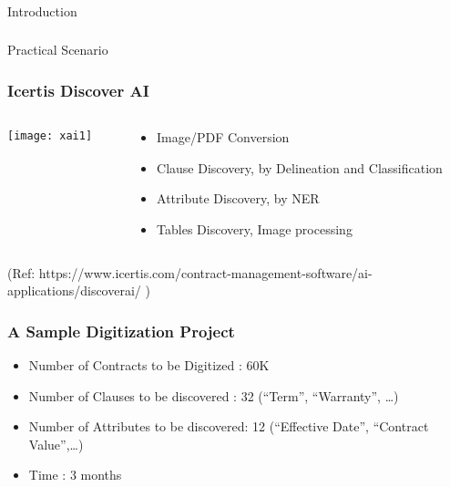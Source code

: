 \begin{frame}[fragile]\frametitle{}
\begin{center}
{\Large Introduction}
\end{center}
\end{frame}

\begin{frame}[fragile]\frametitle{}
\begin{center}
{\Large Practical Scenario}
\end{center}
\end{frame}

\begin{frame}[fragile]\frametitle{Icertis Discover AI}
\begin{columns}
    \begin{column}[T]{0.6\linewidth}
      \begin{center}
      \texttt{[image: xai1]}
	  	\end{center}
    \end{column}
    \begin{column}[T]{0.4\linewidth}

			
				\begin{itemize}
				\item Image/PDF Conversion
				\item Clause Discovery, by Delineation and Classification
				\item Attribute Discovery, by NER
				\item Tables Discovery, Image processing
				\end{itemize}
    \end{column}
  \end{columns}
  
\tiny{(Ref: https://www.icertis.com/contract-management-software/ai-applications/discoverai/ )}
\end{frame}

\begin{frame}[fragile]\frametitle{A Sample Digitization Project}
\begin{itemize}
\item Number of Contracts to be Digitized : 60K
\item Number of Clauses to be discovered : 32 (“Term”, “Warranty”, \ldots)
\item Number of Attributes to be discovered: 12 (“Effective Date”, “Contract Value”,\ldots)
\item Time : 3 months

\end{itemize}
\end{frame}

